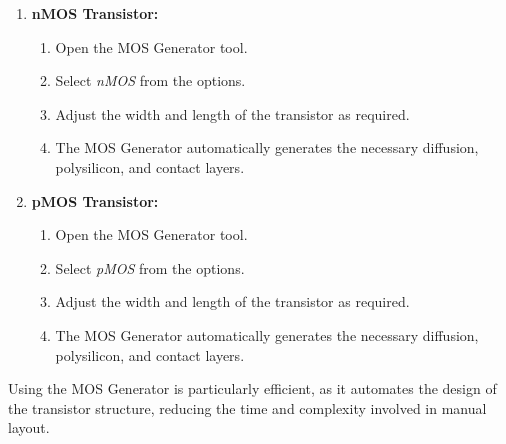 \documentclass[a4paper,12pt]{article}
\begin{document}
	\begin{enumerate}
		\item \textbf{nMOS Transistor:}
		\begin{enumerate}
			\item Open the MOS Generator tool.
			\item Select \textit{nMOS} from the options.
			\item Adjust the width and length of the transistor as required.
			\item The MOS Generator automatically generates the necessary diffusion, polysilicon, and contact layers.
		\end{enumerate}
		
		\item \textbf{pMOS Transistor:}
		\begin{enumerate}
			\item Open the MOS Generator tool.
			\item Select \textit{pMOS} from the options.
			\item Adjust the width and length of the transistor as required.
			\item The MOS Generator automatically generates the necessary diffusion, polysilicon, and contact layers.
		\end{enumerate}
	\end{enumerate}
	
	Using the MOS Generator is particularly efficient, as it automates the design of the transistor structure, reducing the time and complexity involved in manual layout.
	
	
	
	
	
	
	\newpage
\end{document}
